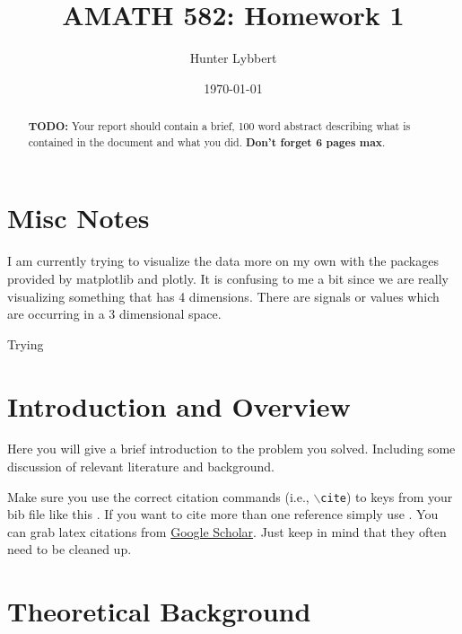 \documentclass[11pt]{amsart}
\title{AMATH 582: Homework 1}
\author{Hunter Lybbert} %
\date{\today} %
\begin{document}
\maketitle

\begin{abstract}
\textbf{TODO:}
    Your report should contain a brief, 100 word abstract describing what is contained in 
    the document and what you did. {\bf Don't forget 6 pages max}.
\end{abstract}

\section{Misc Notes}\label{sec:Notes}
I am currently trying to visualize the data more on my own with the packages provided by matplotlib and plotly.
It is confusing to me a bit since we are really visualizing something that has 4 dimensions. There are signals or values which are occurring in a 3 dimensional space.


\begin{frame}{Trying}
\end{frame}


\section{Introduction and Overview}\label{sec:Introduction}

Here you will give a brief introduction to the problem you solved. Including 
some discussion of relevant literature and background. 

Make sure you use the correct citation commands (i.e., \texttt{$\backslash$cite}) to keys 
from your bib file like this \cite{example-article-citation}. If you want 
to cite more than one reference simply use \cite{example-article-citation, example-book-citation}. You can grab latex citations 
from \href{https://scholar.google.com}{Google Scholar}. Just keep in mind that they often 
need to be cleaned up.

\section{Theoretical Background}\label{sec:theory}
\end{document}
